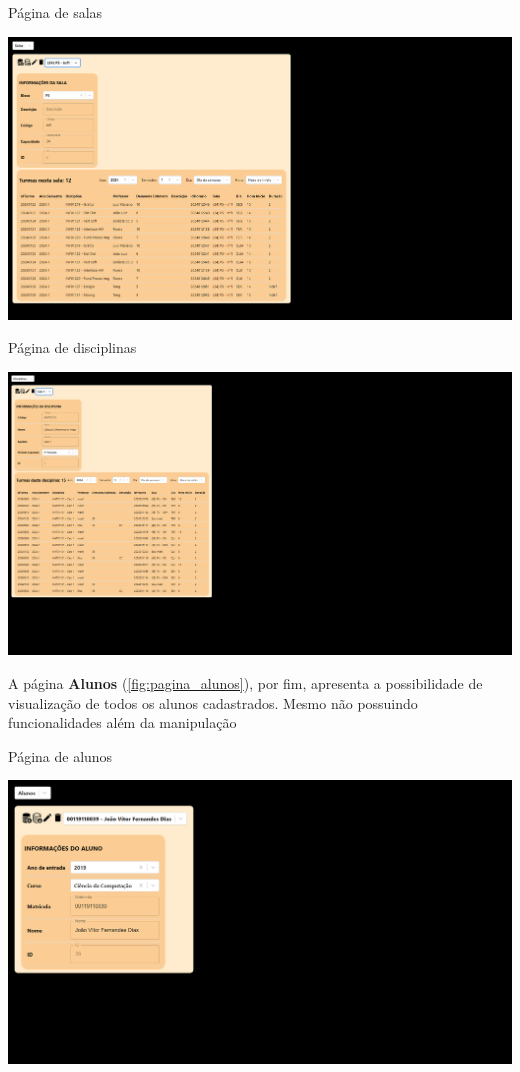 \begin{MyCenteredFigure} \caption{Página de salas} \label{fig:pagina_salas}
  \includegraphics[width=\textwidth]{files/img/2.02!7-resultados/8-Salas.png}
\end{MyCenteredFigure}

\begin{MyCenteredFigure} \caption{Página de disciplinas} \label{fig:pagina_disciplinas}
  \includegraphics[width=\textwidth]{files/img/2.02!7-resultados/9-Disciplinas.png}
\end{MyCenteredFigure}

A página \textbf{Alunos} (\autoref{fig:pagina_alunos}), por fim, apresenta a possibilidade de visualização de todos os alunos cadastrados. Mesmo não possuindo funcionalidades além da manipulação

\begin{MyCenteredFigure} \caption{Página de alunos} \label{fig:pagina_alunos}
  \includegraphics[width=\textwidth]{files/img/2.02!7-resultados/10-Aluno.png}
\end{MyCenteredFigure}


